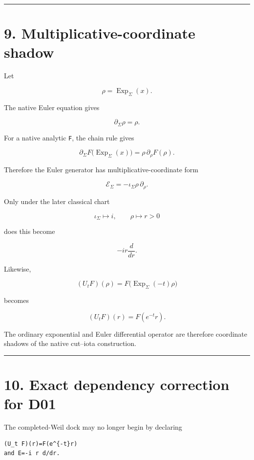 \begin{center}\rule{0.5\linewidth}{0.5pt}\end{center}

\hypertarget{multiplicative-coordinate-shadow}{%
\section{9. Multiplicative-coordinate shadow}\label{multiplicative-coordinate-shadow}}

Let

\[
\rho=\operatorname{Exp}_\Sigma(x).
\]

The native Euler equation gives

\[
\partial_\Sigma\rho=\rho.
\]

For a native analytic \texttt{F}, the chain rule gives

\[
\partial_\Sigma
F\bigl(\operatorname{Exp}_\Sigma(x)\bigr)
=
\rho\,\partial_\rho F(\rho).
\]

Therefore the Euler generator has multiplicative-coordinate form

\[
\boxed{
\mathcal E_\Sigma
=-\iota_\Sigma\rho\,\partial_\rho.
}
\]

Only under the later classical chart

\[
\iota_\Sigma\mapsto i,
\qquad
\rho\mapsto r>0
\]

does this become

\[
-i r\frac{d}{dr}.
\]

Likewise,

\[
(U_tF)(\rho)
=
F\bigl(\operatorname{Exp}_\Sigma(-t)\rho\bigr)
\]

becomes

\[
(U_tF)(r)=F(e^{-t}r).
\]

The ordinary exponential and Euler differential operator are therefore
coordinate shadows of the native cut--iota construction.

\begin{center}\rule{0.5\linewidth}{0.5pt}\end{center}

\hypertarget{exact-dependency-correction-for-d01}{%
\section{10. Exact dependency correction for D01}\label{exact-dependency-correction-for-d01}}

The completed-Weil dock may no longer begin by declaring

\begin{verbatim}
(U_t F)(r)=F(e^{-t}r)
and E=-i r d/dr.
\end{verbatim}

